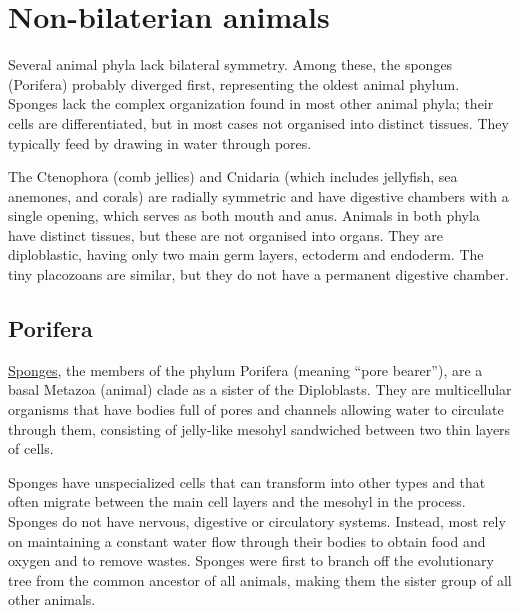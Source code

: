\hypertarget{non-bilaterian-animals}{%
\section{Non-bilaterian animals}\label{non-bilaterian-animals}}

Several animal phyla lack bilateral symmetry. Among these, the sponges (Porifera) probably diverged first, representing the oldest animal phylum. Sponges lack the complex organization found in most other animal phyla; their cells are differentiated, but in most cases not organised into distinct tissues. They typically feed by drawing in water through pores.

The Ctenophora (comb jellies) and Cnidaria (which includes jellyfish, sea anemones, and corals) are radially symmetric and have digestive chambers with a single opening, which serves as both mouth and anus. Animals in both phyla have distinct tissues, but these are not organised into organs. They are diploblastic, having only two main germ layers, ectoderm and endoderm. The tiny placozoans are similar, but they do not have a permanent digestive chamber.

\hypertarget{porifera}{%
\subsection{Porifera}\label{porifera}}

\href{https://en.wikipedia.org/wiki/Sponge}{Sponges}, the members of the phylum Porifera (meaning ``pore bearer''), are a basal Metazoa (animal) clade as a sister of the Diploblasts. They are multicellular organisms that have bodies full of pores and channels allowing water to circulate through them, consisting of jelly-like mesohyl sandwiched between two thin layers of cells.

Sponges have unspecialized cells that can transform into other types and that often migrate between the main cell layers and the mesohyl in the process. Sponges do not have nervous, digestive or circulatory systems. Instead, most rely on maintaining a constant water flow through their bodies to obtain food and oxygen and to remove wastes. Sponges were first to branch off the evolutionary tree from the common ancestor of all animals, making them the sister group of all other animals.



